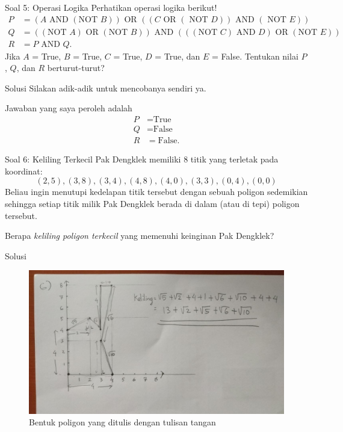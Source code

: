 \documentclass[english,t]{beamer}
\begin{document}
\begin{frame}{Soal 5: Operasi Logika}
Perhatikan operasi logika berikut!
\begin{align*}
P &= (A \text{ AND }(\text{NOT }B)) \text{ OR }((C \text{ OR }(\text{ NOT }D)) \text{ AND } (\text{ NOT }E)) \\
Q &= ((\text{NOT }A) \text{ OR }(\text{NOT }B)) \text{ AND }(((\text{NOT }C) \text{ AND }D) \text{ OR }(\text{NOT } E))  \\
R &= P \text{ AND }Q.
\end{align*}
Jika $A$ = True, $B$ = True, $C$ = True, $D$ = True, dan $E$ = False. Tentukan nilai $P$, $Q$, dan $R$ berturut-turut?
\end{frame}

\begin{frame}{Solusi}
Silakan adik-adik untuk mencobanya sendiri ya. 

\bigskip
Jawaban yang saya peroleh adalah
\begin{align*}
P &= \text{True} \\
Q &= \text{False} \\
R &= \text{False}. 
\end{align*}
\end{frame}

\begin{frame}{Soal 6: Keliling Terkecil}
Pak Dengklek memiliki 8 titik yang terletak pada koordinat:
\begin{equation*}
(2,5), (3,8), (3,4), (4,8), (4,0), (3,3), (0,4), (0,0)
\end{equation*}
Beliau ingin menutupi kedelapan titik tersebut dengan sebuah poligon sedemikian sehingga setiap titik milik Pak Dengklek berada di dalam (atau di tepi) poligon tersebut. 

\bigskip
Berapa \textit{keliling poligon terkecil} yang memenuhi keinginan Pak Dengklek?
\end{frame}

\begin{frame}{Solusi}
\begin{figure}[!ht]
	\centering
	\includegraphics[scale=.26]{images/solusi-soal-6}
	\caption{Bentuk poligon yang ditulis dengan tulisan tangan}
\end{figure}

\end{frame}
\end{document}
